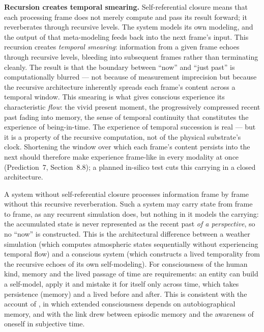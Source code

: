 \documentclass[12pt]{article}
\begin{document}
{\textbf{Recursion creates temporal smearing.} Self-referential closure means that each processing frame does not merely compute and pass its result forward; it reverberates through recursive levels. The system models its own modeling, and the output of that meta-modeling feeds back into the next frame's input. This recursion creates \emph{temporal smearing}: information from a given frame echoes through recursive levels, bleeding into subsequent frames rather than terminating cleanly. The result is that the boundary between ``now'' and ``just past'' is computationally blurred --- not because of measurement imprecision but because the recursive architecture inherently spreads each frame's content across a temporal window. This smearing is what gives conscious experience its characteristic \emph{flow}: the vivid present moment, the progressively compressed recent past fading into memory, the sense of temporal continuity that constitutes the experience of being-in-time. The experience of temporal succession is real --- but it is a property of the recursive computation, not of the physical substrate's clock. Shortening the window over which each frame's content persists into the next should therefore make experience frame-like in every modality at once (Prediction~7, Section~8.8); a planned in-silico test cuts this carrying in a closed architecture.

A system without self-referential closure processes information frame by frame without this recursive reverberation. Such a system may carry state from frame to frame, as any recurrent simulation does, but nothing in it models the carrying: the accumulated state is never represented as the recent past \emph{of a perspective}, so no ``now'' is constructed. This is the architectural difference between a weather simulation (which computes atmospheric states sequentially without experiencing temporal flow) and a conscious system (which constructs a lived temporality from the recursive echoes of its own self-modeling). For consciousness of the human kind, memory and the lived passage of time are requirements: an entity can build a self-model, apply it and mistake it for itself only across time, which takes persistence (memory) and a lived before and after. This is consistent with the account of \citet{Damasio1999}, in which extended consciousness depends on autobiographical memory, and with the link \citet{Tulving1985} drew between episodic memory and the awareness of oneself in subjective time.

}
\end{document}
